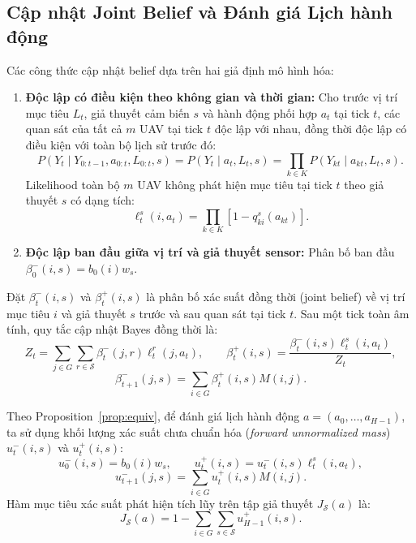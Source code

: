 \documentclass[12pt,a4paper]{article}
\begin{document}
\subsection{Cập nhật Joint Belief và Đánh giá Lịch hành động}

Các công thức cập nhật belief dựa trên hai giả định mô hình hóa:
\begin{enumerate}[label=(A\arabic*)]
    \item \textbf{Độc lập có điều kiện theo không gian và thời gian:} Cho trước vị trí mục tiêu $L_t$, giả thuyết cảm biến $s$ và hành động phối hợp $a_t$ tại tick $t$, các quan sát của tất cả $m$ UAV tại tick $t$ độc lập với nhau, đồng thời độc lập có điều kiện với toàn bộ lịch sử trước đó:
    \begin{equation}
    P(Y_t \mid Y_{0:t-1}, a_{0:t}, L_{0:t}, s) = P(Y_t \mid a_t, L_t, s) = \prod_{k\in K} P(Y_{kt} \mid a_{kt}, L_t, s).
    \end{equation}
    Likelihood toàn bộ $m$ UAV không phát hiện mục tiêu tại tick $t$ theo giả thuyết $s$ có dạng tích:
    \begin{equation}
    \ell_t^s(i,a_t) = \prod_{k\in K} \left[ 1 - q^s_{ki}(a_{kt}) \right].
    \end{equation}
    \item \textbf{Độc lập ban đầu giữa vị trí và giả thuyết sensor:} Phân bố ban đầu $\beta_0^-(i,s) = b_0(i)w_s$.
\end{enumerate}

Đặt $\beta_t^-(i,s)$ và $\beta_t^+(i,s)$ là phân bố xác suất đồng thời (joint belief) về vị trí mục tiêu $i$ và giả thuyết $s$ trước và sau quan sát tại tick $t$. Sau một tick toàn âm tính, quy tắc cập nhật Bayes đồng thời là:
\begin{equation}
Z_t = \sum_{j\in G}\sum_{r\in\mathcal{S}} \beta_t^-(j,r)\ell_t^r(j,a_t),\qquad
\beta_t^+(i,s) = \frac{\beta_t^-(i,s)\ell_t^s(i,a_t)}{Z_t},
\end{equation}
\begin{equation}
\beta_{t+1}^-(j,s) = \sum_{i\in G}\beta_t^+(i,s)M(i,j).
\end{equation}

Theo Proposition~\ref{prop:equiv}, để đánh giá lịch hành động $a = (a_0, \ldots, a_{H-1})$, ta sử dụng khối lượng xác suất chưa chuẩn hóa (\emph{forward unnormalized mass}) $u_t^-(i,s)$ và $u_t^+(i,s)$:
\begin{equation}
u_0^-(i,s) = b_0(i)w_s,\qquad
u_t^+(i,s) = u_t^-(i,s)\ell_t^s(i,a_t),
\end{equation}
\begin{equation}
u_{t+1}^-(j,s) = \sum_{i\in G} u_t^+(i,s)M(i,j).
\end{equation}
Hàm mục tiêu xác suất phát hiện tích lũy trên tập giả thuyết $J_{\mathcal{S}}(a)$ là:
\begin{equation}
J_{\mathcal{S}}(a) = 1 - \sum_{i\in G}\sum_{s\in\mathcal{S}} u_{H-1}^+(i,s).
\end{equation}
\end{document}
